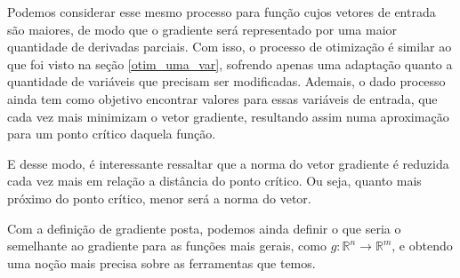 
Podemos considerar esse mesmo processo para função cujos vetores de entrada são
maiores, de modo que o gradiente será representado por uma maior quantidade de
derivadas parciais. Com isso, o processo de otimização é similar ao que foi
visto na seção \ref{otim_uma_var}, sofrendo apenas uma adaptação quanto a
quantidade de variáveis que precisam ser modificadas. Ademais, o dado processo
ainda tem como objetivo encontrar valores para essas variáveis de entrada, que
cada vez mais minimizam o vetor gradiente, resultando assim numa aproximação
para um ponto crítico daquela função.

E desse modo, é interessante ressaltar que a norma do vetor gradiente é reduzida
cada vez mais em relação a distância do ponto crítico. Ou seja, quanto mais
próximo do ponto crítico, menor será a norma do vetor.

Com a definição de gradiente posta, podemos ainda definir o que seria o
semelhante ao gradiente para as funções mais gerais, como
\( g: \mathbb{R}^n \rightarrow \mathbb{R}^m \),
e obtendo uma noção mais precisa sobre as ferramentas que temos.


